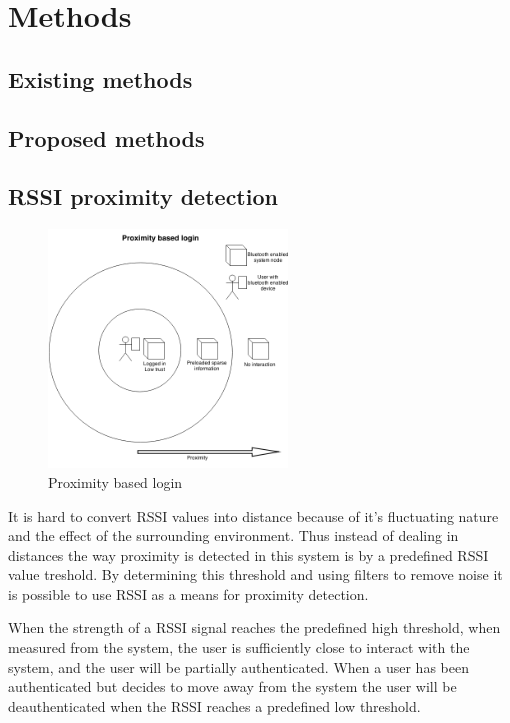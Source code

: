 	\section{Methods}

\subsection{Existing methods}

\subsection{Proposed methods}

\subsection{RSSI proximity detection}

\begin{figure}[!t]
	\centering
	\includegraphics[width=2.5in]{img/proximityBasedLogin}
	\caption{ Proximity based login }
	\label{fig_proximity_based_login}
\end{figure}

It is hard to convert RSSI values into distance because of it's fluctuating nature and the effect of the surrounding environment. Thus instead of dealing in distances the way proximity is detected in this system is by a predefined RSSI value treshold. By determining this threshold and using filters to remove noise it is possible to use RSSI as a means for proximity detection.

When the strength of a RSSI signal reaches the predefined high threshold, when measured from the system, the user is sufficiently close to interact with the system, and the user will be partially authenticated.
When a user has been authenticated but decides to move away from the system the user will be deauthenticated when the RSSI reaches a predefined low threshold.

